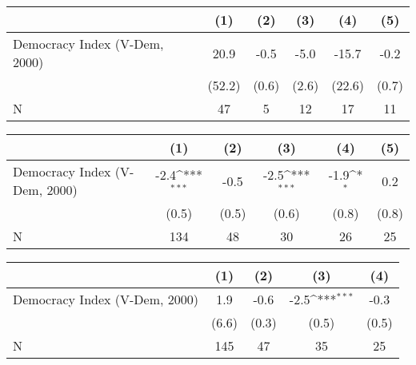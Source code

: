 {
\def\sym#1{\ifmmode^{#1}\else\(^{#1}\)\fi}
\begin{tabular}{l*{5}{c}}
\hline\hline
                    &\multicolumn{1}{c}{(1)}         &\multicolumn{1}{c}{(2)}         &\multicolumn{1}{c}{(3)}         &\multicolumn{1}{c}{(4)}         &\multicolumn{1}{c}{(5)}         \\
\hline
Democracy Index (V-Dem, 2000)&        20.9         &        -0.5         &        -5.0         &       -15.7         &        -0.2         \\
                    &      (52.2)         &       (0.6)         &       (2.6)         &      (22.6)         &       (0.7)         \\
\hline
N                   &          47         &           5         &          12         &          17         &          11         \\
\hline\hline
\end{tabular}
}
{
\def\sym#1{\ifmmode^{#1}\else\(^{#1}\)\fi}
\begin{tabular}{l*{5}{c}}
\hline\hline
                    &\multicolumn{1}{c}{(1)}         &\multicolumn{1}{c}{(2)}         &\multicolumn{1}{c}{(3)}         &\multicolumn{1}{c}{(4)}         &\multicolumn{1}{c}{(5)}         \\
\hline
Democracy Index (V-Dem, 2000)&        -2.4\sym{***}&        -0.5         &        -2.5\sym{***}&        -1.9\sym{*}  &         0.2         \\
                    &       (0.5)         &       (0.5)         &       (0.6)         &       (0.8)         &       (0.8)         \\
\hline
N                   &         134         &          48         &          30         &          26         &          25         \\
\hline\hline
\end{tabular}
}
{
\def\sym#1{\ifmmode^{#1}\else\(^{#1}\)\fi}
\begin{tabular}{l*{4}{c}}
\hline\hline
                    &\multicolumn{1}{c}{(1)}         &\multicolumn{1}{c}{(2)}         &\multicolumn{1}{c}{(3)}         &\multicolumn{1}{c}{(4)}         \\
\hline
Democracy Index (V-Dem, 2000)&         1.9         &        -0.6         &        -2.5\sym{***}&        -0.3         \\
                    &       (6.6)         &       (0.3)         &       (0.5)         &       (0.5)         \\
\hline
N                   &         145         &          47         &          35         &          25         \\
\hline\hline
\end{tabular}
}
